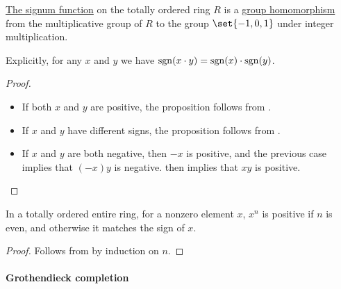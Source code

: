\begin{proposition}\label{thm:def:signum}
  \hyperref[def:signum]{The signum function} on the totally ordered  ring \( R \) is a \hyperref[def:group/homomorphism]{group homomorphism} from the multiplicative group of \( R \) to the group \( \set{ -1, 0, 1 } \) under integer multiplication.

  Explicitly, for any \( x \) and \( y \) we have \( \operatorname{sgn}(x \cdot y) = \operatorname{sgn}(x) \cdot \operatorname{sgn}(y) \).
\end{proposition}
\begin{proof}
  \hfill
  \begin{itemize}
    \item If both \( x \) and \( y \) are positive, the proposition follows from .
    \item If \( x \) and \( y \) have different signs, the proposition follows from .
    \item If \( x \) and \( y \) are both negative, then \( -x \) is positive, and the previous case implies that \( (-x)y \) is negative.  then implies that \( xy \) is positive.
  \end{itemize}
\end{proof}

\begin{corollary}\label{thm:ordered_ring_power}
  In a totally ordered entire ring, for a nonzero element \( x \), \( x^n \) is positive if \( n \) is even, and otherwise it matches the sign of \( x \).
\end{corollary}
\begin{proof}
  Follows from  by induction on \( n \).
\end{proof}

\paragraph{Grothendieck completion}

